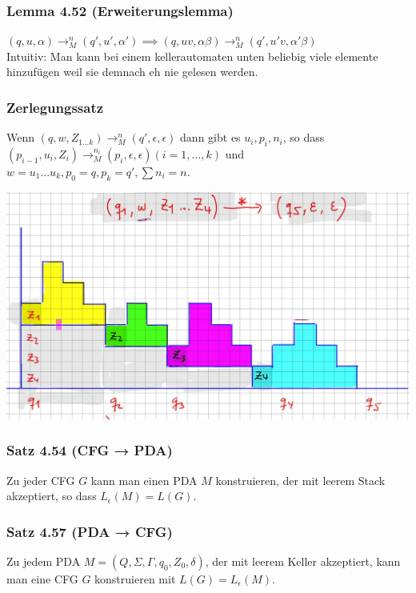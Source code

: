 \documentclass[11pt]{article}
\begin{document}
\subsubsection{Lemma 4.52 (Erweiterungslemma)}
\label{sec:org44a731f}
\((q, u, \alpha) \rightarrow^n_M (q', u', \alpha') \implies (q, uv, \alpha \beta) \rightarrow^n_M (q', u'v, \alpha'\beta)\) \\
Intuitiv: Man kann bei einem kellerautomaten unten beliebig viele elemente hinzufügen weil sie demnach eh nie gelesen werden.

\subsubsection{Zerlegungssatz}
\label{sec:org1603ade}
Wenn \((q, w, Z_{1...k}) \rightarrow^n_M (q', \epsilon, \epsilon)\)
dann gibt es \(u_i, p_i, n_i\), so dass
\((p_{i−1}, u_i, Z_i) \rightarrow^{n_i}_M (p_i, \epsilon, \epsilon) (i = 1, . . . , k)\)
und \(w = u_1 . . . u_k, p_0 = q, p_k = q', \sum n_i = n\).
\begin{center}
\includegraphics[width=.9\linewidth]{./img/3-kapitel/zerlegungssatz.png}
\end{center}

\subsubsection{Satz 4.54 (CFG → PDA)}
\label{sec:orge755796}
Zu jeder CFG \(G\) kann man einen PDA \(M\) konstruieren, der mit leerem Stack akzeptiert, so dass \(L_\epsilon(M) = L(G)\).
\subsubsection{Satz 4.57 (PDA → CFG)}
\label{sec:org4f3356b}
Zu jedem PDA \(M = (Q, \Sigma, \Gamma, q_0, Z_0, \delta)\), der mit leerem Keller
akzeptiert, kann man eine CFG \(G\) konstruieren mit \(L(G) = L_\epsilon(M)\).
\end{document}
